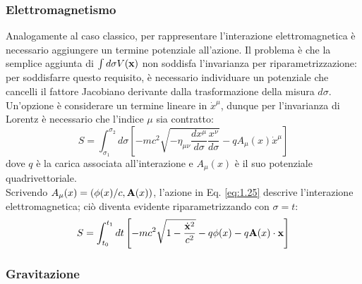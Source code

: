 \subsubsection{Elettromagnetismo}

Analogamente al caso classico, per rappresentare l'interazione elettromagnetica è necessario aggiungere un termine potenziale all'azione. Il problema è che la semplice aggiunta di $ \int d\sigma V(\mathbf{x}) $ non soddisfa l'invarianza per riparametrizzazione: per soddisfarre questo requisito, è necessario individuare un potenziale che cancelli il fattore Jacobiano derivante dalla trasformazione della misura $ d\sigma $. Un'opzione è considerare un termine lineare in $ \dot{x}^{\mu} $, dunque per l'invarianza di Lorentz è necessario che l'indice $ \mu $ sia contratto:
\begin{equation}
  S = \int_{\sigma_1}^{\sigma_2} d\sigma \left[ -mc^2 \sqrt{-\eta_{\mu \nu} \frac{dx^{\mu}}{d\sigma} \frac{x^{\nu}}{d\sigma}} - q A_{\mu}(x) \dot{x}^{\mu} \right]
  \label{eq:1.25}
\end{equation}
dove $ q $ è la carica associata all'interazione e $ A_{\mu}(x) $ è il suo potenziale quadrivettoriale.\\
Scrivendo $ A_{\mu}(x) = (\phi(x)/c, \mathbf{A}(x)) $, l'azione in Eq. \ref{eq:1.25} descrive l'interazione elettromagnetica; ciò diventa evidente riparametrizzando con $ \sigma = t $:
\begin{equation}
  S = \int_{t_0}^{t_1} dt \left[ -mc^2 \sqrt{1 - \frac{\dot{\mathbf{x}}^2}{c^2}} - q\phi(x) - q\mathbf{A}(x)\cdot\mathbf{x} \right]
  \label{eq:1.26}
\end{equation}

\subsubsection{Gravitazione}

